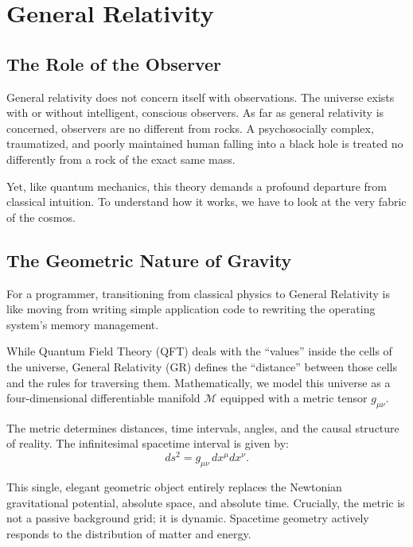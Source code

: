\chapter{General Relativity}
\label{chap:general-relativity}

\section{The Role of the Observer}

General relativity does not concern itself with observations.
The universe exists with or without intelligent, conscious observers.
As far as general relativity is concerned, observers are no different from rocks.
A psychosocially complex, traumatized, and poorly maintained human falling into a black hole is treated no differently from a rock of the exact same mass.

Yet, like quantum mechanics, this theory demands a profound departure from classical intuition.
To understand how it works, we have to look at the very fabric of the cosmos.

\section{The Geometric Nature of Gravity}

For a programmer, transitioning from classical physics to General Relativity is like moving from writing simple application code to rewriting the operating system's memory management. 

While Quantum Field Theory (QFT) deals with the ``values'' inside the cells of the universe, General Relativity (GR) defines the ``distance'' between those cells and the rules for traversing them.
Mathematically, we model this universe as a four-dimensional differentiable manifold $\mathcal{M}$ equipped with a metric tensor $g_{\mu\nu}$.

The metric determines distances, time intervals, angles, and the causal structure of reality.
The infinitesimal spacetime interval is given by:
\begin{equation}
ds^2 = g_{\mu\nu} \, dx^\mu dx^\nu.
\end{equation}

This single, elegant geometric object entirely replaces the Newtonian gravitational potential, absolute space, and absolute time.
Crucially, the metric is not a passive background grid; it is dynamic.
Spacetime geometry actively responds to the distribution of matter and energy.

